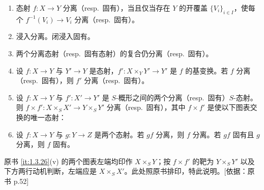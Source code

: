 \begin{proposition}\label{it:1.3.26}
\begin{enumerate}[label=(\roman*),leftmargin=2.8em]
  \item 态射 $f\colon X\to Y$ 分离（resp.\ 固有），当且仅当存在 $Y$ 的开覆盖 $\{V_i\}_{i\in I}$，使每个 $f^{-1}(V_i)\to V_i$ 分离（resp.\ 固有）。
  \item 浸入分离。闭浸入固有。
  \item 两个分离态射（resp.\ 固有态射）的复合仍分离（resp.\ 固有）。
  \item 设 $f\colon X\to Y$ 与 $Y'\to Y$ 是态射，$f'\colon X\times_Y Y'\to Y'$ 是 $f$ 的基变换。若 $f$ 分离（resp.\ 固有），则 $f'$ 分离（resp.\ 固有）。
  \begin{center}
  \end{center}
  \item 设 $f\colon X\to Y$ 与 $f'\colon X'\to Y'$ 是 $S$-概形之间的两个分离（resp.\ 固有）$S$-态射。则 $f\times f'\colon X\times_S X'\to Y\times_S Y'$ 分离（resp.\ 固有），其中 $f\times f'$ 是使以下图表交换的唯一态射：
  \begin{center}
  \qquad
  \end{center}
  \item 设 $f\colon X\to Y$ 与 $g\colon Y\to Z$ 是两个态射。若 $gf$ 分离，则 $f$ 分离。若 $gf$ 固有且 $g$ 分离，则 $f$ 固有。
\end{enumerate}
\end{proposition}

\begin{tnote}
原书 \ref{it:1.3.26}(v) 的两个图表左端均印作 $X\times_S Y$；按 $f\times f'$ 的靶为 $Y\times_S Y'$ 以及下方两行动机判断，左端应是 $X\times_S X'$。此处照原书排印，特此说明。[依据：原书 p.52]
\end{tnote}

